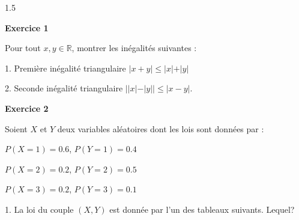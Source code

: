 \documentclass[12pt]{article}
\begin{document}
\begin{spacing}{1.5}

 
 \medskip\textbf{Exercice 1 }

 Pour tout $x,y \in \mathbb{R}$, montrer les inégalités suivantes :
 
 1. Première inégalité triangulaire $\vert x+y\vert \leq \vert x\vert + \vert y\vert$
 
 2. Seconde inégalité triangulaire $\vert\vert x\vert - \vert y\vert\vert\leq\vert x-y\vert$.
 
 \medskip\textbf{Exercice 2}

 Soient $X$ et $Y$ deux variables aléatoires dont les lois sont données par :
 
 $P(X =1)=0.6$, $P(Y =1)=0.4$
 
 $P(X =2)=0.2$, $P(Y =2)=0.5$
 
$P(X =3)=0.2$, $P(Y =3)=0.1$
 
 1. La loi du couple $(X,Y)$ est donnée par l'un des tableaux suivants. Lequel?
 

\end{spacing}
\end{document}
